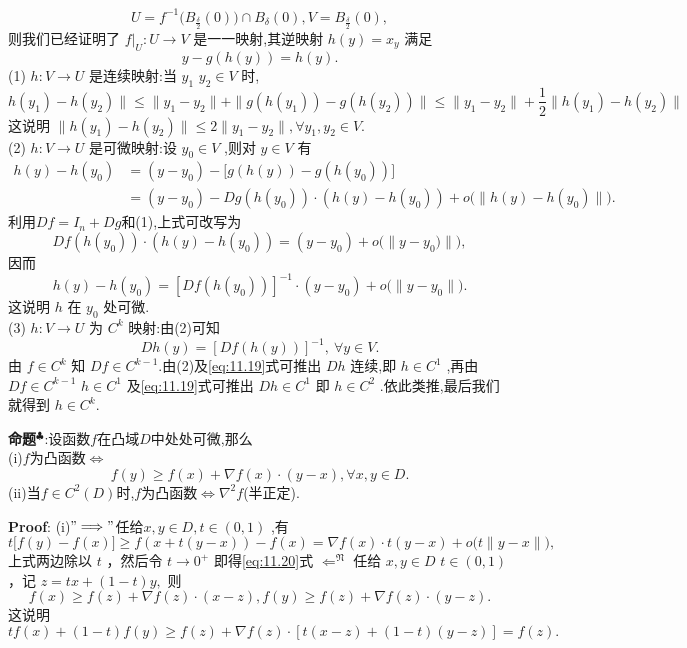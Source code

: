 $$
U=f^{-1}\Big(B_{\frac{\delta}{2}}(0)\Big)\cap B_{\delta}(0),V=B_{\frac{\delta}{2}}(0),
$$
则我们已经证明了 $f|_{U}:U\to V$ 是一一映射,其逆映射 $h(y)=x_{y}$ 满足  
$$
y-g(h(y))=h(y).
$$
(1) $h:V\to U$ 是连续映射:当 $y_{1}$ $y_{2}\in V$ 时,  
$$
h(y_{1})-h(y_{2})\|\leqslant\|y_{1}-y_{2}\|+\|g(h(y_{1}))-g(h(y_{2}))\|\leqslant\|y_{1}-y_{2}\|+\frac{1}{2}\|h(y_{1})-h(y_{2})\|
$$
这说明 $\|h(y_{1})-h(y_{2})\|\leqslant2\|y_{1}-y_{2}\|,\forall y_{1},y_{2}\in V.$\\  
(2) $h:V\to U$ 是可微映射:设 $y_{0}\in V$ ,则对 $y\in V$ 有  
$$
\begin{aligned}
    h(y)-h(y_{0})&=(y-y_{0})-\big[g(h(y))-g(h(y_{0}))\big]\\
                 &=(y-y_{0})-D g(h(y_{0}))\cdot(h(y)-h(y_{0}))+o\big(\|h(y)-h(y_{0})\|\big).
\end{aligned}
$$
利用$D f=I_{n}+D g$和(1),上式可改写为  
$$
D f(h(y_{0}))\cdot(h(y)-h(y_{0}))=(y-y_{0})+o\big(\|y-y_{0})\|\big),
$$
因而  
$$
h(y)-h(y_{0})=\left[D f(h(y_{0}))\right]^{-1}\cdot(y-y_{0})+o\big(\|y-y_{0}\|\big).
$$
这说明 $h$ 在 $y_{0}$ 处可微.\\  
(3) $h:V\to U$ 为 $C^{k}$ 映射:由(2)可知  
\begin{equation}
    D h(y)=\left[D f(h(y))\right]^{-1},~\forall y\in V.
    \label{eq:11.19}
\end{equation}
由 $f\in C^{k}$ 知 $D f\in C^{k-1}$.由(2)及\eqref{eq:11.19}式可推出 $D h$ 连续,即 $h\in C^{1}$ ,再由 $D f\in C^{k-1}$ $h\in C^{1}$ 及\eqref{eq:11.19}式可推出 $D h\in C^{1}$ 即 $h\in C^{2}$ .依此类推,最后我们就得到 $h\in C^{k}$.\par
\textbf{命题}$^\clubsuit $:设函数$f$在凸域$D$中处处可微,那么\\  
(i)$f$为凸函数$\Longleftrightarrow$  
\begin{equation}
f(y)\geqslant f(x)+\nabla f(x)\cdot(y-x),\forall x,y\in D.
\label{eq:11.20}
\end{equation}
(ii)当$f\in C^{2}(D)$时,$f$为凸函数$\Longleftrightarrow\nabla^{2}f$(半正定).\par
\textbf{Proof}: (i)$"\Longrightarrow"$任给$x,y\in D,t\in(0,1)$ ,有  
$$
t\big[f(y)-f(x)\big]\geqslant f(x+t(y-x))-f(x)=\nabla f(x)\cdot t(y-x)+o\big(t\|y-x\|\big),
$$
上式两边除以 $t$ ，然后令 $t\to0^{+}$ 即得\eqref{eq:11.20}式  
$\Longleftarrow^{\mathfrak{N}}$ 任给 $x,y\in D$ $t\in(0,1)$ ，记 $z=t x+(1-t)y,$ 则  
$$
f(x)\geqslant f(z)+\nabla f(z)\cdot(x-z),f(y)\geqslant f(z)+\nabla f(z)\cdot(y-z).
$$
这说明  
$$
t f(x)+(1-t)f(y)\geqslant f(z)+\nabla f(z)\cdot\left[t(x-z)+(1-t)(y-z)\right]=f(z).
$$

